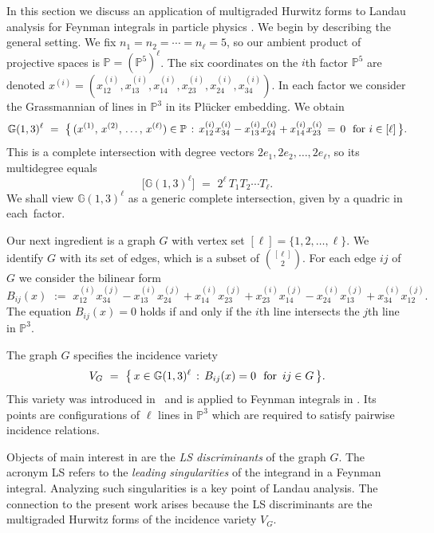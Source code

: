 \documentclass[12pt]{article}
\theoremstyle{definition}
\newcommand{\bG}{\mathbb G}
\newcommand{\bP}{\mathbb P}
\begin{document}
In this section we discuss an application of multigraded Hurwitz forms
to Landau analysis for Feynman integrals in particle physics \cite{HMPS1, HMPS2}.
We begin by describing the general setting.
We fix $ n_1 = n_2 = \cdots = n_\ell = 5$, so our ambient product of projective spaces is
$\bP = (\bP^5)^\ell$. The  six  coordinates on the $i$th factor $\bP^5$ are
denoted  $x^{(i)} = ( x^{(i)}_{12}, x^{(i)}_{13}, x^{(i)}_{14} , x^{(i)}_{23}, x^{(i)}_{24}, x^{(i)}_{34})$.
In each factor we consider the Grassmannian of lines in $\bP^3$ in its Pl\"ucker embedding. We obtain
\begin{equation}
\label{eq:Grell}
{\bG}(1,3)^\ell \,\,=\,\, \bigl\{\,
(x^{(1)},\,x^{(2)},\,\ldots, \,x^{(\ell)}) \in \bP  \,:\,
x^{(i)}_{12} x^{(i)}_{34} - x^{(i)}_{13} x^{(i)}_{24} + x^{(i)}_{14} x^{(i)}_{23}  \,=\, 0
\,\,\,\,\hbox{for}\,\, i \in [\ell] \,\bigr\}.
\end{equation}
This is a complete intersection
with degree vectors $2 e_1, 2 e_2, \ldots , 2 e_\ell$, so its
multidegree equals
$$ \bigl[\bG(1,3)^\ell \bigr] \,\,= \,\, 2^\ell\, T_1 T_2 \cdots T_\ell. $$
We shall view $\bG(1,3)^\ell$ as a generic complete intersection, given by a quadric in each~factor.

\smallskip

Our next ingredient is a graph $G$ with vertex set $[\ell] = \{1,2,\ldots,\ell\}$.
We identify $G$ with its set of edges, which is a subset of $\binom{[\ell]}{2}$.
For each edge $ij$ of $G$ we consider the bilinear form
\begin{equation}
\label{eq:incidencerel}
B_{ij}(x) \,\,:= \,\,
 x^{(i)}_{12} x^{(j)}_{34} 
- x^{(i)}_{13} x^{(j)}_{24}
+ x^{(i)}_{14} x^{(j)}_{23} 
+ x^{(i)}_{23} x^{(j)}_{14}
- x^{(i)}_{24} x^{(j)}_{13} 
+ x^{(i)}_{34} x^{(j)}_{12} .
 \end{equation}
 The equation $B_{ij}(x) = 0$
 holds if and only if the $i$th line intersects the $j$th line in $\bP^3$.
 
 The graph $G$ specifies the incidence variety 
 \begin{equation}
V_G \,\, = \,\, \bigl\{ \,x \in \bG(1,3)^\ell \,: \, B_{ij}(x) = 0 \,\,\, \,{\rm for} \,\,\, ij \in G \, \bigr\}.
\end{equation}
This variety was introduced in~\cite{HMPS1} and  is applied to 
Feynman integrals in \cite{HMPS2}. Its points are 
configurations of $\ell$ lines in $\bP^3$ which are required to satisfy
pairwise incidence relations.

Objects of main interest in \cite{HMPS2} are the {\em LS discriminants} of the graph $G$.
The acronym LS refers to the {\em leading singularities} of the integrand in a Feynman integral.
Analyzing such singularities is a key point of Landau analysis.
The connection to the present work arises because the LS discriminants are the multigraded Hurwitz forms of the incidence variety $V_G$.
\end{document}
